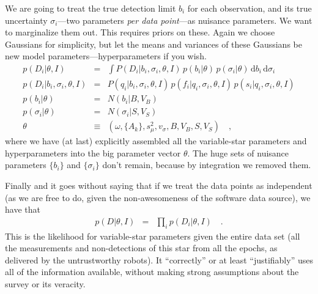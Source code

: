 \documentclass[12pt]{article}
\newcommand{\dd}{\mathrm{d}}
\begin{document}
We are going to treat the true detection limit $b_i$ for each
observation, and its true uncertainty $\sigma_i$---two parameters
\emph{per data point}---as nuisance parameters.  We want to
marginalize them out.  This requires priors on these.  Again we choose
Gaussians for simplicity, but let the means and variances of these
Gaussians be new model parameters---hyperparameters if you wish.
\begin{eqnarray}\displaystyle
p(D_i|\theta,I) &=&
  \int P(D_i|b_i,\sigma_i,\theta,I)\,p(b_i|\theta)\,p(\sigma_i|\theta)\,\dd b_i\,\dd\sigma_i
\\
p(D_i|b_i,\sigma_i,\theta,I) &=&
  P(q_i|b_i,\sigma_i,\theta,I)\,p(f_i|q_i,\sigma_i,\theta,I)\,p(s_i|q_i,\sigma_i,\theta,I)
\\
p(b_i|\theta) &=& N(b_i|B,V_B)
\\
p(\sigma_i|\theta) &=& N(\sigma_i|S,V_S)
\\
\theta &\equiv& (\omega, \{A_k\}, s_\mu^2, v_\sigma, B, V_B, S, V_S)
\quad,
\end{eqnarray}
where we have (at last) explicitly assembled all the variable-star
parameters and hyperparameters into the big parameter vector $\theta$.
The huge sets of nuisance parameters $\{b_i\}$ and
$\{\sigma_i\}$ don't remain, because by integration we
removed them.

Finally and it goes without saying that if we treat the data points as
independent (as we are free to do, given the non-awesomeness of the
software data source), we have that
\begin{eqnarray}\displaystyle
p(D|\theta,I) &=& \prod_i p(D_i|\theta,I)
\quad.
\end{eqnarray}
This is the likelihood for variable-star parameters given the entire
data set (all the measurements and non-detections of this star from
all the epochs, as delivered by the untrustworthy robots).  It
``correctly'' or at least ``justifiably'' uses all of the information
available, without making strong assumptions about the survey or its
veracity.
\end{document}
